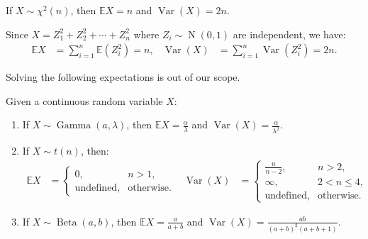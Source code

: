 \documentclass{huhtakm-template-book-v2}
\newcommand{\expect}{\mathbb{E}}
\DeclareMathOperator{\N}{N}
\DeclareMathOperator{\Gam}{Gamma}
\DeclareMathOperator{\Beta}{Beta}
\DeclareMathOperator{\Var}{Var}
\begin{document}
    \begin{thm}
        If $X \sim \chi^{2}(n)$, then $\expect{X} = n$ and $\Var(X) = 2n$.
    \end{thm}
    \begin{proofing}
        Since $X = Z_{1}^{2} + Z_{2}^{2} + \cdots + Z_{n}^{2}$ where $Z_{i} \sim \N(0,1)$ are independent, we have:
        \begin{align*}
            \expect{X} &= \sum_{i = 1}^{n}\expect(Z_{i}^{2}) = n, & \Var(X) &= \sum_{i = 1}^{n}\Var(Z_{i}^{2}) = 2n.
        \end{align*}
    \end{proofing}
    Solving the following expectations is out of our scope.
    \begin{thm}
        Given a continuous random variable $X$:
        \begin{enumerate}
            \item If $X \sim \Gam(a,\lambda)$, then $\expect{X} = \frac{\alpha}{\lambda}$ and $\Var(X) = \frac{\alpha}{\lambda^{2}}$.
            \item If $X \sim t(n)$, then:
            \begin{align*}
                \expect{X} &= \begin{cases}
                    0, & n > 1,\\
                    \text{undefined}, & \text{otherwise}.
                \end{cases} & \Var(X) &= \begin{cases}
                    \frac{n}{n-2}, & n > 2,\\
                    \infty, & 2 < n \leq 4,\\
                    \text{undefined}, & \text{otherwise}.
                \end{cases}
            \end{align*}
            \item If $X \sim \Beta(a, b)$, then $\expect{X} = \frac{a}{a+b}$ and $\Var(X) = \frac{ab}{(a+b)^{2}(a+b+1)}$.
        \end{enumerate}
    \end{thm}
    \newpage
\end{document}
